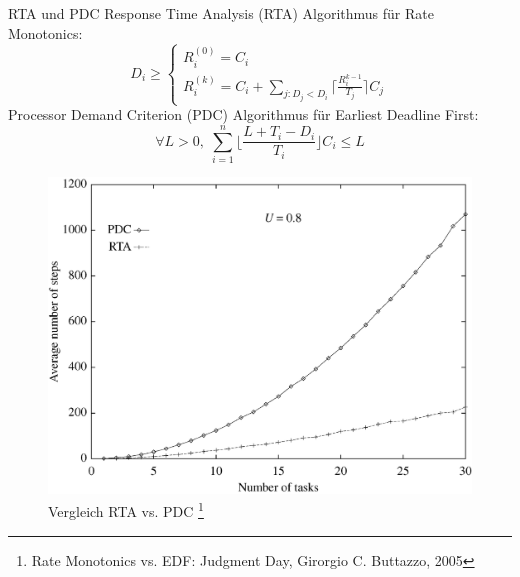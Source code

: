 \begin{frame}

\end{frame}

\begin{frame}{RTA und PDC}
	Response Time Analysis (RTA) Algorithmus für Rate Monotonics:
	\begin{equation}
		D_i \geq
		\begin{cases}
   				R_i^{(0)}=C_i \\
   				R_i^{(k)}=C_i+ \sum_{j:D_j<D_i} \lceil \frac{R_i^{k-1}}{T_j}\rceil C_j
  		\end{cases}
	\end{equation}
	Processor Demand Criterion (PDC) Algorithmus für Earliest Deadline First:
	\begin{equation}
		\forall L > 0,\; \sum_{i=1}^n\lfloor \frac{L+T_i-D_i}{T_i}\rfloor C_i \leq L
	\end{equation}

	\begin{figure}[htbp]
		\begin{center}	
			\includegraphics[scale=.30]{graphics/vergleich/rtapdc.png}
		\end{center}
		\caption{Vergleich RTA vs. PDC \footnote{Rate Monotonics vs. EDF: Judgment Day, Girorgio C. Buttazzo, 2005}}	
		\label{fig:RTAvsPDC}
	\end{figure}
\end{frame}

